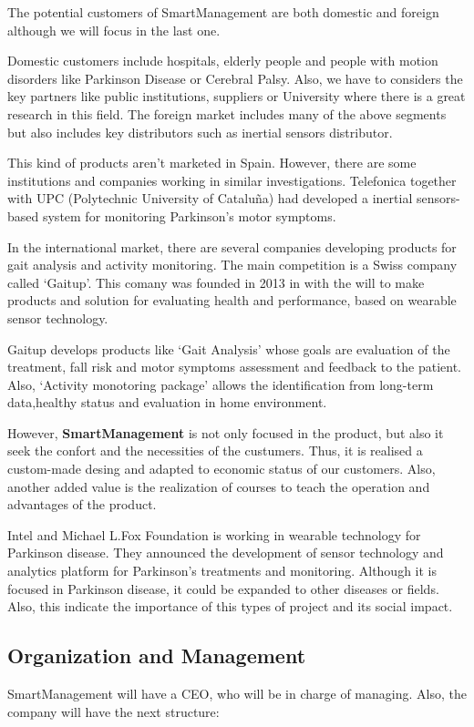  The potential customers of SmartManagement are both domestic and foreign although we will focus in the last one.
 
 Domestic customers include hospitals, elderly people and people with motion disorders like Parkinson Disease or Cerebral Palsy. Also, we have to considers the key partners like public institutions, suppliers or University where there is a great research in this field.
  The foreign market includes many of the above segments but also includes key distributors such as inertial sensors distributor.
 
 This kind of products aren’t marketed in Spain. However, there are some institutions and companies working in similar investigations. Telefonica  together with UPC (Polytechnic University of Cataluña) had developed a inertial sensors-based system for monitoring Parkinson's motor symptoms\cite{rempark}.
 
 In the international market, there are several companies developing products for gait analysis and activity monitoring. The main competition is a Swiss company called ‘Gaitup’\cite{gaitup}. This comany was founded in 2013 in with the will to make products and solution for evaluating health and performance, based on wearable sensor technology.
 
 Gaitup develops products like ‘Gait Analysis’ whose goals are evaluation of the treatment, fall risk and motor symptoms assessment and feedback to the patient. Also, ‘Activity monotoring package’ allows the identification from long-term data,healthy status and  evaluation in home environment.
 
 However, \textbf{SmartManagement} is not only focused in the product, but also it seek the confort and the necessities of the custumers. Thus, it is realised a custom-made desing and adapted to economic status of our customers. Also, another added value is the realization of courses to teach the operation and advantages of the product.
 
 Intel and Michael L.Fox Foundation is working in wearable technology for Parkinson disease. They announced the development of sensor technology and analytics platform for Parkinson’s treatments and monitoring\cite{IntelAndMjf}. Although it is focused in Parkinson disease, it could be expanded to other diseases or fields. Also, this indicate the importance of this types of project and its social impact.


\subsection{Organization and Management}
SmartManagement will have a CEO, who will be  in charge of managing. Also, the company will have the next structure:

